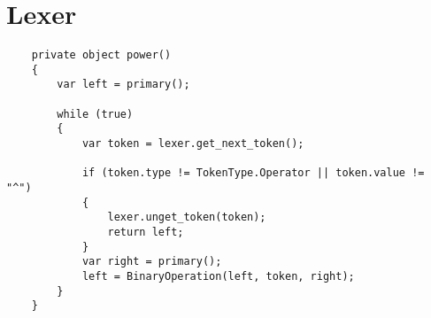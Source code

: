 \section{Lexer}

\lstset{style=sharpc}
\begin{lstlisting}
    private object power()
    {
        var left = primary();

        while (true)
        {
            var token = lexer.get_next_token();

            if (token.type != TokenType.Operator || token.value != "^")
            {
                lexer.unget_token(token);
                return left;
            }
            var right = primary();
            left = BinaryOperation(left, token, right);
        }
    }
\end{lstlisting}

